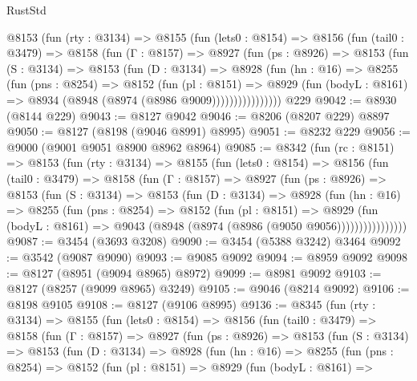 \begin{lexlean}{RustStd}
\begin{coremodule}
      @8153
        (fun (rty : @3134) =>
        @8155
          (fun (lets0 : @8154) =>
          @8156
            (fun (tail0 : @3479) =>
            @8158
              (fun (Γ : @8157) =>
              @8927
                (fun (ps : @8926) =>
                @8153
                  (fun (S : @3134) =>
                  @8153
                    (fun (D : @3134) =>
                    @8928
                      (fun (hn : @16) =>
                      @8255
                        (fun (pns : @8254) =>
                        @8152
                          (fun (pl : @8151) =>
                          @8929
                            (fun (bodyL : @8161) => @8934 (@8948 (@8974 (@8986 @9009))))))))))))))))
    @229
@9042 := @8930 (@8144 @229)
@9043 := @8127 @9042
@9046 := @8206 (@8207 @229) @8897
@9050 := @8127 (@8198 (@9046 @8991) @8995)
@9051 := @8232 @229
@9056 := @9000 (@9001 @9051 @8900 @8962 @8964)
@9085 := @8342
    (fun (rc : @8151) =>
    @8153
      (fun (rty : @3134) =>
      @8155
        (fun (lets0 : @8154) =>
        @8156
          (fun (tail0 : @3479) =>
          @8158
            (fun (Γ : @8157) =>
            @8927
              (fun (ps : @8926) =>
              @8153
                (fun (S : @3134) =>
                @8153
                  (fun (D : @3134) =>
                  @8928
                    (fun (hn : @16) =>
                    @8255
                      (fun (pns : @8254) =>
                      @8152
                        (fun (pl : @8151) =>
                        @8929
                          (fun (bodyL : @8161) =>
                          @9043 (@8948 (@8974 (@8986 (@9050 @9056))))))))))))))))
@9087 := @3454 (@3693 @3208)
@9090 := @3454 (@5388 @3242) @3464
@9092 := @3542 (@9087 @9090)
@9093 := @9085 @9092
@9094 := @8959 @9092
@9098 := @8127 (@8951 (@9094 @8965) @8972)
@9099 := @8981 @9092
@9103 := @8127 (@8257 (@9099 @8965) @3249)
@9105 := @9046 (@8214 @9092)
@9106 := @8198 @9105
@9108 := @8127 (@9106 @8995)
@9136 := @8345
    (fun (rty : @3134) =>
    @8155
      (fun (lets0 : @8154) =>
      @8156
        (fun (tail0 : @3479) =>
        @8158
          (fun (Γ : @8157) =>
          @8927
            (fun (ps : @8926) =>
            @8153
              (fun (S : @3134) =>
              @8153
                (fun (D : @3134) =>
                @8928
                  (fun (hn : @16) =>
                  @8255
                    (fun (pns : @8254) =>
                    @8152
                      (fun (pl : @8151) =>
                      @8929
                        (fun (bodyL : @8161) =>

\end{coremodule}
\end{lexlean}
